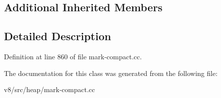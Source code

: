 \subsection*{Additional Inherited Members}


\subsection{Detailed Description}


Definition at line 860 of file mark-\/compact.\+cc.



The documentation for this class was generated from the following file\+:\begin{DoxyCompactItemize}
\item 
v8/src/heap/mark-\/compact.\+cc\end{DoxyCompactItemize}
